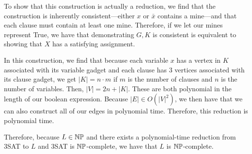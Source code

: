 \documentclass[11pt, reqno]{amsart}
\theoremstyle{plain}
\theoremstyle{definition}
\newcounter{r}
\begin{document}
\begin{enumerate}
    To show that this construction is actually a reduction, we find that the
    construction is inherently consistent---either $x$ or $\bar{x}$ contains a
    mine---and that each clause must contain at least one mine. Therefore, if
    we let our mines represent True, we have that demonstrating $G, K$ is
    consistent is equivalent to showing that $X$ has a satisfying assignment.

    In this construction, we find that because each variable $x$ has a vertex
    in $K$ associated with its variable gadget and each clause has $3$ vertices
    associated with its clause gadget, we get $|K| = n\cdot m$ if $m$ is the
    number of clauses and $n$ is the number of variables. Then, $|V| = 2n +
    |K|$. These are both polynomial in the length of our boolean expression.
    Because $|E| \in O(|V|^2)$, we then have that we can also construct all of
    our edges in polynomial time. Therefore, this reduction is polynomial time.

    Therefore, because $L\in \mathbb{N}\mathbb{P}$ and there exists a polynomial-time
    reduction from 3SAT to $L$ and 3SAT is $\mathbb{N}\mathbb{P}$-complete, we have that $L$
    is $\mathbb{N}\mathbb{P}$-complete.


\end{enumerate}
\end{document}
